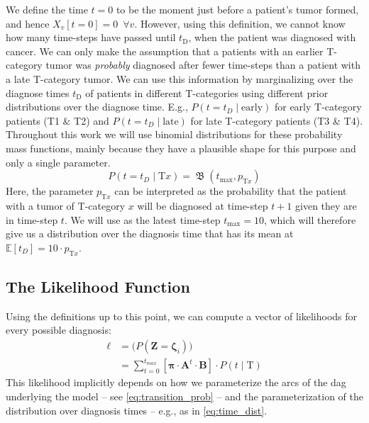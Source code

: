 \documentclass[twocolumn]{aastex631}
\begin{document}
We define the time $t=0$ to be the moment just before a patient's tumor formed, and hence $X_v[t=0]=0 \,\,\, \forall v$. However, using this definition, we cannot know how many time-steps have passed until $t_\text{D}$, when the patient was diagnosed with cancer. We can only make the assumption that a patients with an earlier T-category tumor was \emph{probably} diagnosed after fewer time-steps than a patient with a late T-category tumor. We can use this information by marginalizing over the diagnose times $t_\text{D}$ of patients in different T-categories using different prior distributions over the diagnose time. E.g., $P \left( t=t_D \mid \text{early} \right)$ for early T-category patients (T1 \& T2) and $P \left( t=t_D \mid \text{late} \right)$ for late T-category patients (T3 \& T4). Throughout this work we will use binomial distributions for these probability mass functions, mainly because they have a plausible shape for this purpose and only a single parameter.
%
\begin{equation} \label{eq:time_dist}
    P \left( t = t_D \mid \text{T}x \right) = \operatorname{\mathfrak{B}}(t_\text{max},p_{\text{T}x})
\end{equation}
%
Here, the parameter $p_{\text{T}x}$ can be interpreted as the probability that the patient with a tumor of T-category $x$ will be diagnosed at time-step $t+1$ given they are in time-step $t$. We will use as the latest time-step $t_\text{max} = 10$, which will therefore give us a distribution over the diagnosis time that has its mean at $\mathbb{E}[t_D] = 10 \cdot p_{\text{T}x}$.


\subsection{The Likelihood Function}
\label{subsec:formalism:likelihood}

Using the definitions up to this point, we can compute a vector of likelihoods for every possible diagnosis:
%
\begin{equation} \label{eq:likelihood_vec}
\begin{split}
    \boldsymbol{\ell} &= \big( P\left( \mathbf{Z} = \boldsymbol{\zeta}_i \right) \big) \\
    &= \sum_{t=0}^{t_{max}} \left[ \boldsymbol{\pi} \cdot \mathbf{A}^t \cdot \mathbf{B} \right] \cdot P \left( t \mid \text{T} \right)
\end{split}
\end{equation}
%
This likelihood implicitly depends on how we parameterize the arcs of the \gls{dag} underlying the model -- see \cref{eq:transition_prob} -- and the parameterization of the distribution over diagnosis times -- e.g., as in \cref{eq:time_dist}. 
\end{document}
